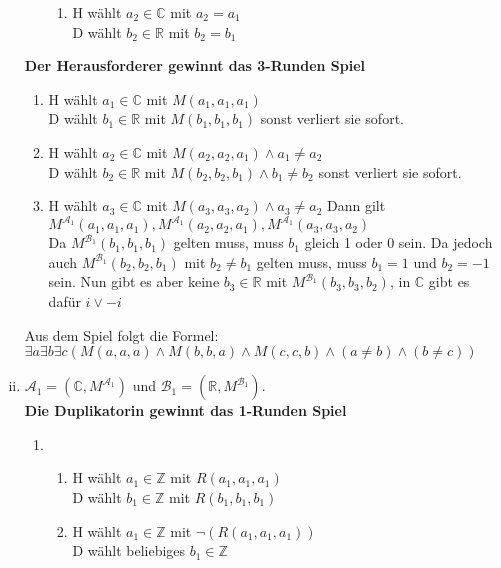 \documentclass[a4paper,10pt]{article}
\newcommand{\Z}{\mathbb{Z}}
\begin{document}
\begin{enumerate}[(i)]
\begin{enumerate}
\begin{enumerate}
				\item  	H wählt $a_2 \in \mathbb{C}$ mit $a_2 = a_1$ \\
					D wählt $b_2 \in \mathbb{R}$ mit  $b_2 = b_1$
			\end{enumerate}
		\end{enumerate}
	\textbf{Der Herausforderer gewinnt das 3-Runden Spiel}
		\begin{enumerate}[1. \text{Zug:}]
			\item  	H wählt $a_1 \in \mathbb{C}$ mit $M(a_1,a_1,a_1)$ \\
				D wählt $b_1 \in \mathbb{R}$ mit $M(b_1,b_1,b_1)$ sonst verliert sie sofort.
			\item 	H wählt $a_2 \in \mathbb{C}$ mit $M(a_2,a_2,a_1) \land a_1 \neq a_2$ \\
				D wählt $b_2 \in \mathbb{R}$ mit $M(b_2,b_2,b_1) \land b_1 \neq b_2$ sonst verliert sie sofort.
			\item  	H wählt $a_3 \in \mathbb{C}$ mit $M(a_3,a_3,a_2) \land a_3 \neq a_2$
			Dann gilt $M^{\mathcal{A}_1}(a_1,a_1,a_1), M^{\mathcal{A}_1}(a_2,a_2,a_1), M^{\mathcal{A}_1}(a_3,a_3,a_2)$ \\
			Da $M^{\mathcal{B}_1}(b_1,b_1,b_1)$ gelten muss, muss $b_1$ gleich 1 oder 0 sein. Da jedoch auch $M^{\mathcal{B}_1}(b_2,b_2,b_1)$ mit $b_2 \neq b_1$ gelten muss, muss $b_1 = 1$ und $b_2 = -1$ sein. Nun gibt es aber keine $b_3 \in \mathbb{R}$ mit $M^{\mathcal{B}_1}(b_3,b_3,b_2)$, in $\mathbb{C}$ gibt es dafür $i \lor -i$
		\end{enumerate}
	Aus dem Spiel folgt die Formel: $\exists a \exists b \exists c (M(a,a,a) \land M(b,b,a) \land M(c,c,b) \land (a \neq b) \land (b \neq c))$ 
	\item  	$\mathcal{A}_1 = (\mathbb{C},M^{\mathcal{A}_1})$ und $\mathcal{B}_1 = (\mathbb{R}, M^{\mathcal{B}_1})$. \\
	\textbf{Die Duplikatorin gewinnt das 1-Runden Spiel}
		\begin{enumerate}[1. \text{Zug:}]
			\item  	
			\begin{enumerate}
				\item  	H wählt $a_1 \in \Z$ mit $R(a_1,a_1,a_1)$ \\
					D wählt $b_1 \in \Z$ mit $R(b_1,b_1,b_1) $ 
				\item  	H wählt $a_1 \in \mathbb{Z}$ mit $\lnot(R(a_1,a_1,a_1))$ \\
					D wählt beliebiges $b_1 \in \mathbb{Z}$
			\end{enumerate}

\end{enumerate}
\end{enumerate}
\end{document}
